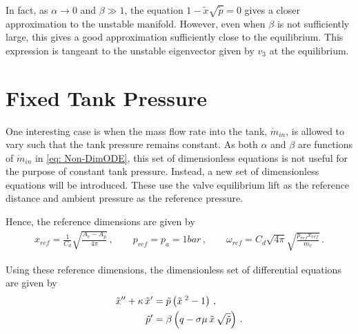 In fact, as $\alpha \rightarrow 0$ and $\beta \gg 1$, the equation $1 - \tilde{x} \sqrt{\tilde{p}} = 0$ gives a closer approximation to the unstable manifold. However, even when $\beta$ is not sufficiently large, this gives a good approximation sufficiently close to the equilibrium. This expression is tangeant to the unstable eigenvector given by $v_3$ at the equilibrium.

% 

\section{Fixed Tank Pressure}

One interesting case is when the mass flow rate into the tank, $\dot{m}_{in}$, is allowed to vary such that the tank pressure remains constant. As both $\alpha$ and $\beta$ are functions of $\dot{m}_{in}$ in \cref{eq: Non-DimODE}, this set of dimensionless equations is not useful for the purpose of constant tank pressure. Instead, a new set of dimensionless equations will be introduced. These use the valve equilibrium lift as the reference distance and ambient pressure as the reference pressure.

Hence, the reference dimensions are given by
~
\begin{equation*}
\begin{split}
    x_{ref} = \frac{1}{C_d} \sqrt{\frac{A_v - A_p}{4 \pi}}
    \, , \qquad
    p_{ref} = p_a = 1 \si{bar}
    \, , \qquad
    \omega_{ref} = C_d \sqrt{4 \pi} \sqrt{\frac{p_{ref} x_{ref}}{m_v}} \, .
\end{split}
\end{equation*}

Using these reference dimensions, the dimensionless set of differential equations are given by
~
\begin{equation} \label{eq: AltNonDim}
\begin{split}
    \tilde{x}{''} + \kappa \, \tilde{x}{'} &=  \tilde{p} \left( \tilde{x}^{\;2}  - 1 \right) \, , \\
    \tilde{p}{'} &= \beta \left( q - \sigma \mu \, \tilde{x} \, \sqrt{\tilde{p}} \right) \, .
\end{split}
\end{equation}

